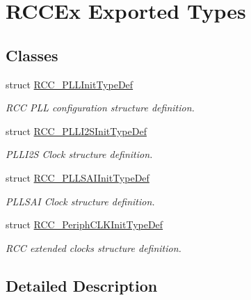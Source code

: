 \hypertarget{group___r_c_c_ex___exported___types}{}\section{R\+C\+C\+Ex Exported Types}
\label{group___r_c_c_ex___exported___types}
\subsection*{Classes}
\begin{DoxyCompactItemize}
\item 
struct \hyperlink{struct_r_c_c___p_l_l_init_type_def}{R\+C\+C\+\_\+\+P\+L\+L\+Init\+Type\+Def}
\begin{DoxyCompactList}\small\item\em R\+CC P\+LL configuration structure definition. \end{DoxyCompactList}\item 
struct \hyperlink{struct_r_c_c___p_l_l_i2_s_init_type_def}{R\+C\+C\+\_\+\+P\+L\+L\+I2\+S\+Init\+Type\+Def}
\begin{DoxyCompactList}\small\item\em P\+L\+L\+I2S Clock structure definition. \end{DoxyCompactList}\item 
struct \hyperlink{struct_r_c_c___p_l_l_s_a_i_init_type_def}{R\+C\+C\+\_\+\+P\+L\+L\+S\+A\+I\+Init\+Type\+Def}
\begin{DoxyCompactList}\small\item\em P\+L\+L\+S\+AI Clock structure definition. \end{DoxyCompactList}\item 
struct \hyperlink{struct_r_c_c___periph_c_l_k_init_type_def}{R\+C\+C\+\_\+\+Periph\+C\+L\+K\+Init\+Type\+Def}
\begin{DoxyCompactList}\small\item\em R\+CC extended clocks structure definition. \end{DoxyCompactList}\end{DoxyCompactItemize}


\subsection{Detailed Description}
